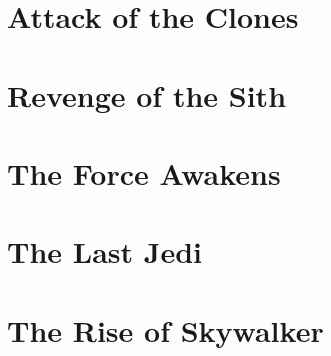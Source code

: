\documentclass[oneside]{ifgw}
\begin{document}
\chapter{Attack of the Clones}	
\lipsum[1-10]

\chapter{Revenge of the Sith}	
\lipsum[1-10]

\chapter{The Force Awakens}
\lipsum[1-10]

\chapter{The Last Jedi}
\lipsum[1-10]

\chapter{The Rise of Skywalker}
\lipsum[1-10]
\end{document}
